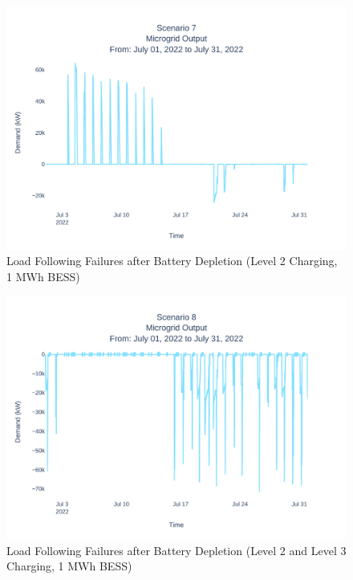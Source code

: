 \documentclass[conference]{IEEEtran}
\begin{document}
	\begin{figure}
	\centering
	\includegraphics[width=0.9\linewidth]{Fig/Option_3/4_Scenario_7_Run_3_Mg_Output_Jul_01_2022_to_Jul_31_2022.pdf}
	\caption{\footnotesize Load Following Failures after Battery Depletion (Level 2 Charging, 1 MWh BESS)}
	\label{fig:scenario3peakshaving}
\end{figure}
\begin{figure}
	\centering
	\includegraphics[width=0.9\linewidth]{Fig/Option_3/4_Scenario_8_Run_3_Mg_Output_Jul_01_2022_to_Jul_31_2022.pdf}
	\caption{\footnotesize Load Following Failures after Battery Depletion (Level 2 and Level 3 Charging, 1 MWh BESS)}
	\label{fig:scenario4peakshaving}
\end{figure}
\end{document}
